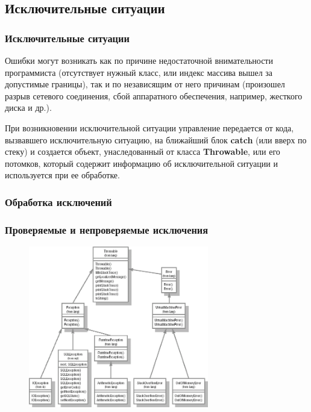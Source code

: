 \documentclass[default]{beamer}
\begin{document}
	\subsection{Исключительные ситуации}
	\begin{frame}
		\frametitle{Исключительные ситуации}
		
		Ошибки могут возникать как по причине недостаточной внимательности программиста (отсутствует нужный класс, или индекс массива вышел за допустимые границы), так и по независящим от него причинам (произошел разрыв сетевого соединения, сбой аппаратного обеспечения, например, жесткого диска и др.).
		
		\par\bigskip
		При возникновении исключительной ситуации управление передается от кода, вызвавшего исключительную ситуацию, на ближайший блок \textbf{catch} (или вверх по стеку) и создается объект, унаследованный от класса \textbf{Throwable}, или его потомков, который содержит информацию об исключительной ситуации и используется при ее обработке.
	\end{frame}

	\begin{frame}
		\frametitle{Обработка исключений}
		
		\lstExceptions
	\end{frame}

	\begin{frame}
		\frametitle{Проверяемые и непроверяемые исключения}
		
		\begin{figure}
			\includegraphics[width=0.7\textwidth]{exceptions.png}
		\end{figure}
	\end{frame}

	
\end{document}
